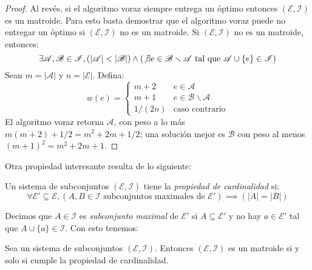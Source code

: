 \begin{proof}
    Al revés,
    si el algoritmo voraz siempre entrega un óptimo
    entonces \((\mathscr{E}, \mathscr{I})\) es un matroide.
    Para esto basta demostrar que el algoritmo voraz
    puede no entregar un óptimo
    si \((\mathscr{E}, \mathscr{I})\) no es un matroide.
    Si \((\mathscr{E}, \mathscr{I})\) no es un matroide,
    entonces:
    \begin{equation*}
      \exists \mathscr{A}, \mathscr{B} \in \mathscr{I},
        (\lvert \mathscr{A} \rvert < \lvert\mathscr{B} \rvert)
          \wedge
            (\not\exists e \in \mathscr{B} \smallsetminus \mathscr{A}
               \text{\ tal que\ } \mathscr{A} \cup \{ e \} \in \mathscr{I})
    \end{equation*}
    Sean \(m = \lvert \mathscr{A} \rvert\)
    y \(n = \lvert \mathscr{E} \rvert\).
    Defina:
    \begin{equation*}
      w(e)
        = \begin{cases}
             m + 2	 & e \in \mathscr{A} \\
             m + 1	 & e \in \mathscr{B} \smallsetminus \mathscr{A} \\
             1 / (2 n)	 & \text{caso contrario}
          \end{cases}
    \end{equation*}
    El algoritmo voraz retorna \(\mathscr{A}\),
    con peso a lo más \(m (m + 2) + 1 / 2 = m^2 + 2 m + 1 / 2\);
    una solución mejor es \(\mathscr{B}\)
    con peso al menos \((m + 1)^2 = m^2 + 2 m + 1\).
  \end{proof}
  Otra propiedad interesante resulta de lo siguiente:
  \begin{definition}
    Un sistema de subconjuntos \((\mathscr{E}, \mathscr{I})\)
    tiene la \emph{propiedad de cardinalidad}
    si:
    \begin{equation}
      \label{eq:propiedad-cardinalidad}
      \forall \mathscr{E}' \subseteq \mathscr{E},
         (A, B \in \mathscr{I}
            \text{\ subconjuntos maximales de \(\mathscr{E'}\)})
           \implies ( \lvert A \rvert = \lvert B \rvert )
    \end{equation}
  \end{definition}
  Decimos que \(A \in \mathscr{I}\)
  es \emph{subconjunto maximal} de \(\mathscr{E}'\)
  si \(A \subseteq \mathscr{E}'\) y no hay \(a \in \mathscr{E}'\)
  tal que \(A \cup \{ a \} \in \mathscr{I}\).
  Con esto tenemos:
  \begin{theorem}
    Sea un sistema de subconjuntos \((\mathscr{E}, \mathscr{I})\).
    Entonces \((\mathscr{E}, \mathscr{I})\) es un matroide
    si y solo si cumple la propiedad de cardinalidad.
  \end{theorem}
